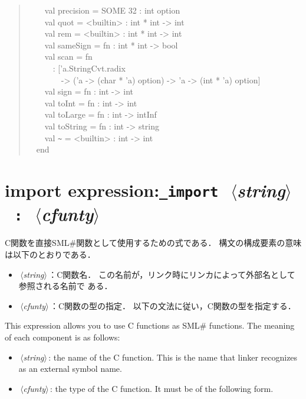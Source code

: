 \documentclass{jbook}
\newcommand{\txt}[2]{#2}
\newcommand{\smlsharp}{SML\#}
\newcommand{\nonterm}[1]{\mbox{$\,\langle$}{\it #1}\mbox{$\rangle\,$}}
\newcommand{\term}[1]{\mbox{{\tt #1}}}
\newcommand{\myem}{\mbox{\ \ }}
\newenvironment{program}{\begin{quote}\begin{tt}}%
                        {\end{tt}\end{quote}}
\begin{document}
\begin{program}
\myem\myem    val precision = SOME 32 : int option\\
\myem\myem    val quot = <builtin> : int * int -> int\\
\myem\myem    val rem = <builtin> : int * int -> int\\
\myem\myem    val sameSign = fn : int * int -> bool\\
\myem\myem    val scan = fn\\
\myem\myem\myem      : ['a.StringCvt.radix\\
\myem\myem\myem\myem              -> ('a -> (char * 'a) option) -> 'a -> (int * 'a) option]\\
\myem\myem    val sign = fn : int -> int\\
\myem\myem    val toInt = fn : int -> int\\
\myem\myem    val toLarge = fn : int -> intInf\\
\myem\myem    val toString = fn : int -> string\\
\myem\myem    val \verb|~| = <builtin> : int -> int\\
\myem end
\end{program}


\section{\txt{インポート式}{import expression}:\term{\_import}\ \nonterm{string}\ \term{:}\ \nonterm{cfunty}}
\label{sec:reference:cffi}
\ifjp%
	C関数を直接\smlsharp{}関数として使用するための式である．
	構文の構成要素の意味は以下のとおりである．
\begin{itemize}
\item \nonterm{string}：C関数名．
	この名前が，リンク時にリンカによって外部名として参照される名前で
ある．
\item \nonterm{cfunty}：C関数の型の指定．
	以下の文法に従い，C関数の型を指定する．
\end{itemize}	
\else%
	This expression allows you to use C functions as
\smlsharp{} functions.
	The meaning of each component is as follows:
\begin{itemize}
\item \nonterm{string}: the name of the C function.
	This is the name that linker recognizes as an external symbol
name.
\item \nonterm{cfunty}: the type of the C function.
	It must be of the following form.
\end{itemize}	
\fi%
\end{document}
